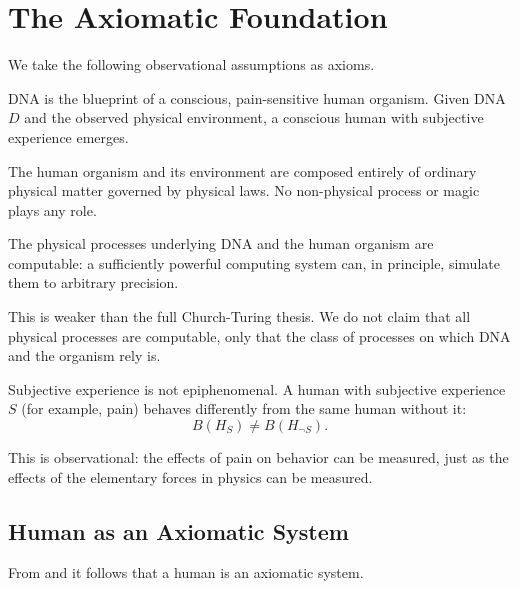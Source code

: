\documentclass[11pt]{book}
\begin{document}
\chapter{The Axiomatic Foundation}
\label{ch:axioms}


We take the following observational assumptions as axioms.

\begin{axiom}\label{ax:genetic}
  DNA is the blueprint of a conscious, pain-sensitive human organism. Given
  DNA $D$ and the observed physical environment, a conscious human with
  subjective experience emerges.
\end{axiom}


\begin{axiom}\label{ax:closure}
  The human organism and its environment are composed entirely of
  ordinary physical matter governed by physical laws. No non-physical
  process or magic plays any role.
\end{axiom}


\begin{axiom}\label{ax:church-turing}
  The physical processes underlying DNA and the human organism are
  computable: a sufficiently powerful computing system can, in principle,
  simulate them to arbitrary precision.

  This is weaker than the full Church-Turing thesis. We do not claim that
  all physical processes are computable, only that the class of processes
  on which DNA and the organism rely is.
\end{axiom}


\begin{axiom}\label{ax:pain}
  Subjective experience is not epiphenomenal. A human with subjective
  experience $S$ (for example, pain) behaves differently from the same human
  without it:
  \[
    B(H_S) \neq B(H_{\neg S}).
  \]
\end{axiom}

This is observational: the effects of pain on behavior can be measured,
just as the effects of the elementary forces in physics can be measured.


\section{Human as an Axiomatic System}

From  and  it follows that a human is an
axiomatic system.
\end{document}
